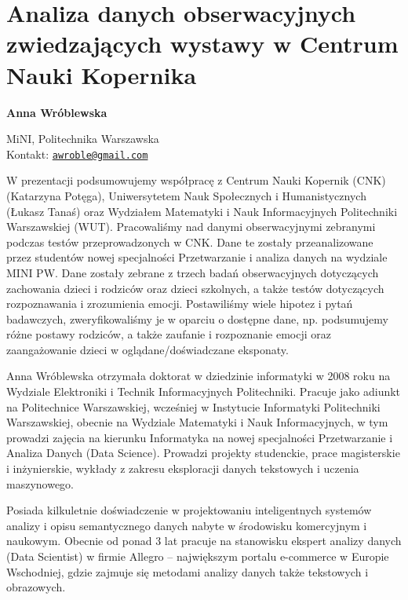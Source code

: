 \documentclass[\main/boa.tex]{subfiles}
\begin{document}
\section{Analiza danych obserwacyjnych zwiedzających wystawy w Centrum Nauki Kopernika}


\begin{minipage}{0.915\textwidth}
	\centering
  {\bf \huge {} Anna Wróblewska}
\end{minipage}


\vskip 0.3cm

\begin{affiliations}
\begin{minipage}{0.915\textwidth}
\centering
\large MiNI, Politechnika Warszawska  \\[5pt]
Kontakt: \href{mailto:awroble@gmail.com}{\nolinkurl{awroble@gmail.com}}\\
\end{minipage}
\end{affiliations}

\vskip 0.8cm
W prezentacji podsumowujemy współpracę z Centrum Nauki Kopernik (CNK) (Katarzyna Potęga), Uniwersytetem Nauk Społecznych i Humanistycznych (Łukasz Tanaś) oraz Wydziałem Matematyki i Nauk Informacyjnych Politechniki Warszawskiej (WUT). Pracowaliśmy nad danymi obserwacyjnymi zebranymi podczas testów przeprowadzonych w CNK. Dane te zostały przeanalizowane przez studentów nowej specjalności Przetwarzanie i analiza danych na wydziale MINI PW.
Dane zostały zebrane z trzech badań obserwacyjnych dotyczących zachowania dzieci i rodziców oraz dzieci szkolnych, a także testów dotyczących rozpoznawania i zrozumienia emocji.
Postawiliśmy wiele hipotez i pytań badawczych, zweryfikowaliśmy je w oparciu o dostępne dane, np. podsumujemy różne postawy rodziców, a także zaufanie i rozpoznanie emocji oraz zaangażowanie dzieci w oglądane/doświadczane eksponaty. 

\bio
Anna Wróblewska otrzymała doktorat w dziedzinie informatyki w 2008 roku na Wydziale Elektroniki i Technik Informacyjnych Politechniki. Pracuje jako adiunkt na Politechnice Warszawskiej, wcześniej w Instytucie Informatyki Politechniki Warszawskiej, obecnie na Wydziale Matematyki i Nauk Informacyjnych, w tym prowadzi zajęcia na kierunku Informatyka na nowej specjalności Przetwarzanie i Analiza Danych (Data Science). Prowadzi projekty studenckie, prace magisterskie i inżynierskie, wykłady z zakresu eksploracji danych tekstowych i uczenia maszynowego.

Posiada kilkuletnie doświadczenie w projektowaniu inteligentnych systemów analizy i opisu semantycznego danych nabyte w środowisku komercyjnym i naukowym. Obecnie od ponad 3 lat pracuje na stanowisku ekspert analizy danych (Data Scientist) w firmie Allegro – największym portalu e-commerce w Europie Wschodniej, gdzie zajmuje się metodami analizy danych także tekstowych i obrazowych.
\end{document}
